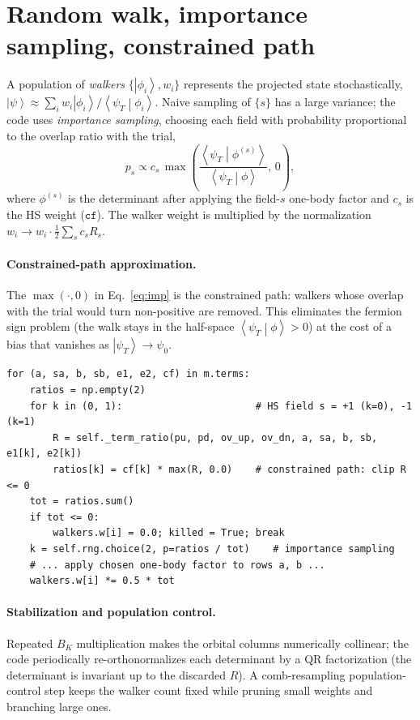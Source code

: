 \documentclass[11pt]{article}
\newcommand{\ket}[1]{\left|#1\right\rangle}
\newcommand{\bracket}[2]{\left\langle#1\middle|#2\right\rangle}
\newcommand{\psiT}{\ket{\psi_T}}
\begin{document}
\section{Random walk, importance sampling, constrained path}
A population of \emph{walkers} $\{\ket{\phi_i}, w_i\}$ represents the projected
state stochastically, $\ket{\psi}\approx\sum_i w_i \ket{\phi_i}/\bracket{\psi_T}{\phi_i}$.
Naive sampling of $\{s\}$ has a large variance; the code uses
\emph{importance sampling}, choosing each field with probability proportional to
the overlap ratio with the trial,
\begin{equation}
p_s \propto c_s \,\max\!\left(
\frac{\bracket{\psi_T}{\phi^{(s)}}}{\bracket{\psi_T}{\phi}},\,0\right),
\label{eq:imp}
\end{equation}
where $\phi^{(s)}$ is the determinant after applying the field-$s$ one-body
factor and $c_s$ is the HS weight ($\texttt{cf}$). The walker weight is multiplied
by the normalization $w_i \to w_i\cdot\tfrac12\sum_s c_s R_s$.

\paragraph{Constrained-path approximation.}
The $\max(\cdot,0)$ in Eq.~\eqref{eq:imp} is the constrained path: walkers whose
overlap with the trial would turn non-positive are removed. This eliminates the
fermion sign problem (the walk stays in the half-space
$\bracket{\psi_T}{\phi}>0$) at the cost of a bias that vanishes as $\psiT\to\psi_0$.

\begin{lstlisting}[caption={One importance-sampled, constrained step
(\texttt{Propagator.step}).}]
for (a, sa, b, sb, e1, e2, cf) in m.terms:
    ratios = np.empty(2)
    for k in (0, 1):                       # HS field s = +1 (k=0), -1 (k=1)
        R = self._term_ratio(pu, pd, ov_up, ov_dn, a, sa, b, sb, e1[k], e2[k])
        ratios[k] = cf[k] * max(R, 0.0)    # constrained path: clip R <= 0
    tot = ratios.sum()
    if tot <= 0:
        walkers.w[i] = 0.0; killed = True; break
    k = self.rng.choice(2, p=ratios / tot)    # importance sampling
    # ... apply chosen one-body factor to rows a, b ...
    walkers.w[i] *= 0.5 * tot
\end{lstlisting}

\paragraph{Stabilization and population control.}
Repeated $B_K$ multiplication makes the orbital columns numerically collinear;
the code periodically re-orthonormalizes each determinant by a QR factorization
(the determinant is invariant up to the discarded $R$). A comb-resampling
population-control step keeps the walker count fixed while pruning small weights
and branching large ones.
\end{document}
